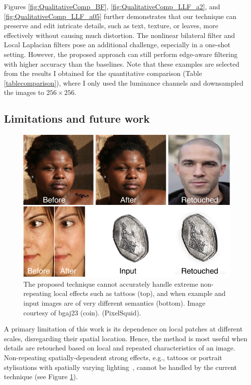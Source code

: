 Figures \ref{fig:QualitativeComp_BF}, \ref{fig:QualitativeComp_LLF_a2}, and \ref{fig:QualitativeComp_LLF_a05} further demonstrates that our technique can preserve and edit intricate details, such as text, texture, or leaves, more effectively without causing much distortion. The nonlinear bilateral filter and Local Laplacian filters pose an additional challenge, especially in a one-shot setting. However, the proposed approach can still perform edge-aware filtering with higher accuracy than the baselines. Note that these examples are selected from the results I obtained for the quantitative comparison (Table \ref{tablecomparison}), where I only used the luminance channels and downsampled the images to $256 \times 256$. 


\subsection{Limitations and future work}
\begin{figure}[th] %
	\centering
	\includegraphics[width=0.8\columnwidth]{Chapters/detail-retouching-figs/Limitations.pdf}
    \caption{\label{fig:limitations} The proposed technique cannot accurately handle extreme non-repeating local effects such as tattoos (top), and when example and input images are of very different semantics (bottom). Image courtesy of bgaj23 (coin). (PixelSquid).}

\end{figure}
A primary limitation of this work is its dependence on local patches at different scales, disregarding their spatial location. Hence, the method is most useful when details are retouched based on local and repeated characteristics of an image. Non-repeating spatially-dependent strong effects, e.g., tattoos or portrait stylisations with spatially varying lighting~\cite{Shih14Style}, cannot be handled by the current technique (see Figure \ref{fig:limitations}).


